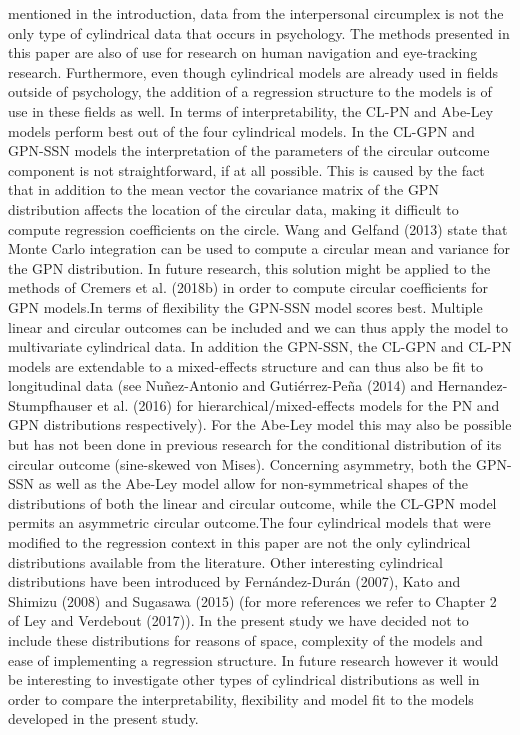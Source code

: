 \documentclass[man]{apa6}
\theoremstyle{definition}
\theoremstyle{definition}
\theoremstyle{definition}
\theoremstyle{remark}
\begin{document}
mentioned in the introduction, data from the interpersonal circumplex is
not the only type of cylindrical data that occurs in psychology. The
methods presented in this paper are also of use for research on human
navigation and eye-tracking research. Furthermore, even though
cylindrical models are already used in fields outside of psychology, the
addition of a regression structure to the models is of use in these
fields as well. \newline \indent In terms of interpretability, the CL-PN
and Abe-Ley models perform best out of the four cylindrical models. In
the CL-GPN and GPN-SSN models the interpretation of the parameters of
the circular outcome component is not straightforward, if at all
possible. This is caused by the fact that in addition to the mean vector
the covariance matrix of the GPN distribution affects the location of
the circular data, making it difficult to compute regression
coefficients on the circle. Wang and Gelfand (2013) state that Monte
Carlo integration can be used to compute a circular mean and variance
for the GPN distribution. In future research, this solution might be
applied to the methods of Cremers et al. (2018b) in order to compute
circular coefficients for GPN models.\newline \indent In terms of
flexibility the GPN-SSN model scores best. Multiple linear and circular
outcomes can be included and we can thus apply the model to multivariate
cylindrical data. In addition the GPN-SSN, the CL-GPN and CL-PN models
are extendable to a mixed-effects structure and can thus also be fit to
longitudinal data (see Nuñez-Antonio and Gutiérrez-Peña (2014) and
Hernandez-Stumpfhauser et al. (2016) for hierarchical/mixed-effects
models for the PN and GPN distributions respectively). For the Abe-Ley
model this may also be possible but has not been done in previous
research for the conditional distribution of its circular outcome
(sine-skewed von Mises). Concerning asymmetry, both the GPN-SSN as well
as the Abe-Ley model allow for non-symmetrical shapes of the
distributions of both the linear and circular outcome, while the CL-GPN
model permits an asymmetric circular outcome.\newline \indent The four
cylindrical models that were modified to the regression context in this
paper are not the only cylindrical distributions available from the
literature. Other interesting cylindrical distributions have been
introduced by Fernández-Durán (2007), Kato and Shimizu (2008) and
Sugasawa (2015) (for more references we refer to Chapter 2 of Ley and
Verdebout (2017)). In the present study we have decided not to include
these distributions for reasons of space, complexity of the models and
ease of implementing a regression structure. In future research however
it would be interesting to investigate other types of cylindrical
distributions as well in order to compare the interpretability,
flexibility and model fit to the models developed in the present
study.\newline
\end{document}
